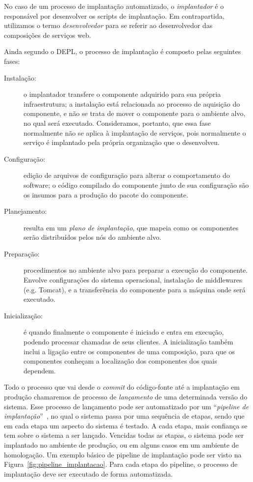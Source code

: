 No caso de um processo de implantação automatizado, o \emph{implantador}
é o responsável por desenvolver os scripts de implantação.
Em contrapartida, utilizamos o termo \emph{desenvolvedor} para se referir ao
desenvolvedor das composições de serviços web.

Ainda segundo o DEPL, o processo de implantação é composto pelas seguintes fases:

\begin{description}
\item [Instalação:] o implantador transfere o componente adquirido para sua própria infraestrutura; a instalação está relacionada ao processo de aquisição do componente, e não se trata de mover o componente para o ambiente alvo, no qual será executado. Consideramos, portanto, que essa fase normalmente não se aplica à implantação de serviços, pois normalmente o serviço é implantado pela própria organização que o desenvolveu.
\item [Configuração:] edição de arquivos de configuração para alterar o comportamento do software; 
o código compilado do componente junto de sua configuração são os insumos para a produção do pacote do componente.
\item [Planejamento:] resulta em um \emph{plano de implantação}, que mapeia como os componentes serão distribuídos pelos nós do ambiente alvo.  
\item [Preparação:] procedimentos no ambiente alvo para preparar a execução do componente. Envolve configurações do sistema operacional, instalação de middlewares (e.g. Tomcat), e a transferência do componente para a máquina onde será executado. 
\item [Inicialização:] é quando finalmente o componente é iniciado e entra em execução, podendo processar chamadas de seus clientes. A inicialização também inclui a ligação entre os componentes de uma composição, para que os componentes conheçam a localização dos componentes dos quais dependem.
\end{description}

Todo o processo que vai desde o \emph{commit} do código-fonte até a implantação em produção
chamaremos de processo de \emph{lançamento} de uma determinada versão do sistema.
Esse processo de lançamento pode ser automatizado por um 
``\emph{pipeline de implantação}''~\cite{Humble2011Continuous},
no qual o sistema passa por uma sequência de etapas,
sendo que em cada etapa um aspecto do sistema é testado.
A cada etapa, mais confiança se tem sobre o sistema a ser lançado.
Vencidas todas as etapas, o sistema pode ser implantado no ambiente de produção,
ou em alguns casos em um ambiente de homologação.
Um exemplo básico de pipeline de implantação pode ser visto na Figura~\ref{fig:pipeline_implantacao}.
Para cada etapa do pipeline, o processo de implantação 
deve ser executado de forma automatizada.

